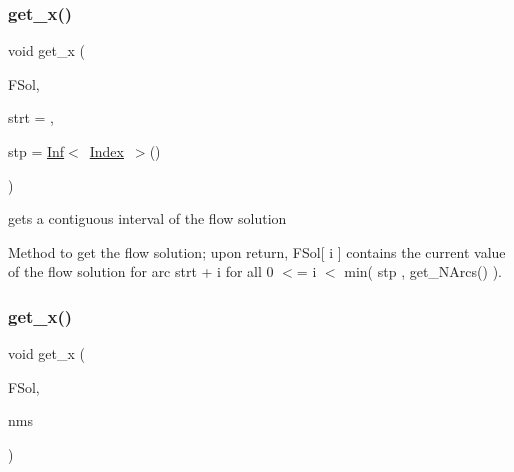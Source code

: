 \subsubsection{\texorpdfstring{get\+\_\+x()}{get\_x()}\hspace{0.1cm}{\footnotesize\ttfamily [1/2]}}
{\footnotesize\ttfamily void get\+\_\+x (\begin{DoxyParamCaption}\item[{\mbox{\hyperlink{class_s_m_spp__di__unipi__it_1_1_m_c_f_block_a3797c4b5074703bb8488c17055606ce4}{Vec\+\_\+\+F\+Number}} \&}]{F\+Sol,  }\item[{\mbox{\hyperlink{class_s_m_spp__di__unipi__it_1_1_m_c_f_block_aee6156e2ce80720d57a082d80f39d8cc}{c\+\_\+\+Index}}}]{strt = {},  }\item[{\mbox{\hyperlink{class_s_m_spp__di__unipi__it_1_1_m_c_f_block_aee6156e2ce80720d57a082d80f39d8cc}{c\+\_\+\+Index}}}]{stp = {\ttfamily \mbox{\hyperlink{class_s_m_spp__di__unipi__it_1_1_inf}{Inf}}$<$~\mbox{\hyperlink{class_s_m_spp__di__unipi__it_1_1_m_c_f_block_ad53d6229d7ec28555a9c9c2fd9abf773}{Index}}~$>$()} }\end{DoxyParamCaption})}



gets a contiguous interval of the flow solution 

Method to get the flow solution; upon return, F\+Sol\mbox{[} i \mbox{]} contains the current value of the flow solution for arc strt + i for all 0 $<$= i $<$ min( stp , get\+\_\+\+N\+Arcs() ). \mbox{\label{class_s_m_spp__di__unipi__it_1_1_m_c_f_block_a2528364a2b42722a661adfecd1c33b3f}} 
\subsubsection{\texorpdfstring{get\+\_\+x()}{get\_x()}\hspace{0.1cm}{\footnotesize\ttfamily [2/2]}}
{\footnotesize\ttfamily void get\+\_\+x (\begin{DoxyParamCaption}\item[{\mbox{\hyperlink{class_s_m_spp__di__unipi__it_1_1_m_c_f_block_a3797c4b5074703bb8488c17055606ce4}{Vec\+\_\+\+F\+Number}} \&}]{F\+Sol,  }\item[{\mbox{\hyperlink{class_s_m_spp__di__unipi__it_1_1_m_c_f_block_a03461123d4f6090aefeb97ef653d3f2b}{c\+\_\+\+Vec\+\_\+\+Index}} \&}]{nms }\end{DoxyParamCaption})}



